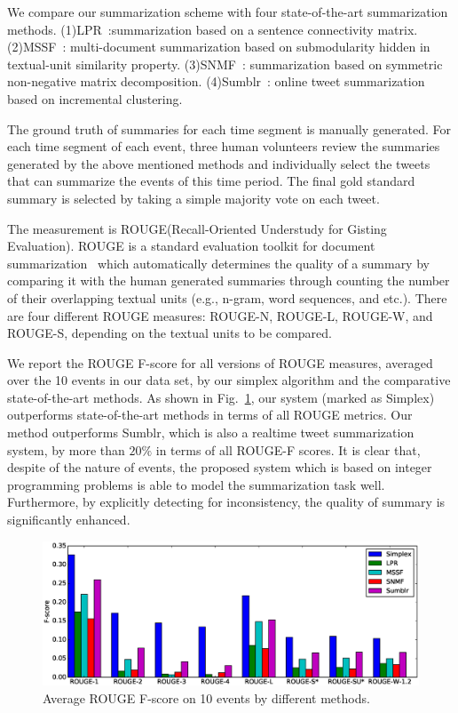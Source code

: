 \documentclass[envcountsame]{llncs}
\begin{document}
We compare our summarization scheme with  four state-of-the-art summarization methods. (1)LPR~\cite{LPR}:summarization based on a sentence connectivity matrix. (2)MSSF~\cite{MSSF}:  multi-document summarization based on submodularity hidden in textual-unit similarity property. (3)SNMF~\cite{SNMF}: summarization based on  symmetric non-negative matrix decomposition. (4)Sumblr~\cite{Shou2013Sumblr}: online tweet summarization based on incremental clustering.

The ground truth of summaries for each time segment is manually generated. For each time segment of each event, three human volunteers review the summaries generated by the above mentioned methods and individually select the tweets that can summarize the events of this time period. The final gold standard summary is selected by taking a simple majority vote on each tweet.

The measurement is ROUGE(Recall-Oriented Understudy for Gisting Evaluation). ROUGE is a standard evaluation toolkit for document summarization~\cite{ROUGE} which automatically determines the quality of a summary by comparing it with the human generated summaries through counting the number of their overlapping textual units (e.g., n-gram, word sequences, and etc.). There are four different ROUGE measures: ROUGE-N, ROUGE-L, ROUGE-W, and ROUGE-S, depending on the textual units to be compared.

We report the  ROUGE F-score for all versions of ROUGE measures, averaged over the 10 events in our data set, by our simplex algorithm and the comparative state-of-the-art methods. As shown in Fig.~\ref{fig:rouge}, our system (marked as Simplex) outperforms state-of-the-art methods in terms of all ROUGE metrics. Our method outperforms Sumblr, which is also a realtime tweet summarization system, by more than $20\%$ in terms of all ROUGE-F scores. It is clear that, despite of the nature of events, the proposed system which is based on integer programming problems is able to model the summarization task well. Furthermore, by explicitly detecting for inconsistency, the quality of summary is significantly enhanced. 

\vspace{-0.5cm}
\begin{figure}
    \centering
    \includegraphics[width=\textwidth]{rouge10.eps}
\setlength{\abovecaptionskip}{-0.5cm}
\caption{Average ROUGE F-score on 10 events by different methods.}\label{fig:rouge}
\end{figure}
\vspace{-0.5cm}
\end{document}
